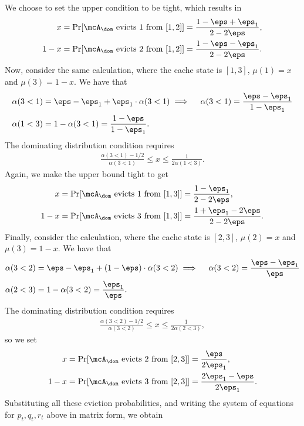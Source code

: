\documentclass[11pt]{article}
\begin{document}
We choose to set the upper condition to be tight, which results in
\begin{align*}
    x &= \Pr[\text{$\mcA_\dom$ evicts 1 from }[1,2]] = \frac{1-\eps+\eps_1}{2-2\eps}, \\
    1-x &= \Pr[\text{$\mcA_\dom$ evicts 2 from }[1,2]] = \frac{1-\eps-\eps_1}{2-2\eps}.
\end{align*}
Now, consider the same calculation, where the cache state is $[1,3]$, $\mu(1)=x$ and $\mu(3)=1-x$. We have that
\begin{align*}
    \alpha(3<1) &= \eps-\eps_1 + \eps_1 \cdot \alpha(3<1) \implies\quad \alpha(3<1) = \frac{\eps-\eps_1}{1-\eps_1} \\
    \alpha(1<3) &= 1-\alpha(3<1) = \frac{1-\eps}{1-\eps_1}.
\end{align*}
The dominating distribution condition requires
\begin{align*} 
    \frac{\alpha(3<1)-1/2}{\alpha(3<1)} \le x \le \frac{1}{2\alpha(1<3)}.
\end{align*}
Again, we make the upper bound tight to get
\begin{align*}
    x &= \Pr[\text{$\mcA_\dom$ evicts 1 from }[1,3]] = \frac{1-\eps_1}{2-2\eps}, \\
    1-x &= \Pr[\text{$\mcA_\dom$ evicts 3 from }[1,3]] = \frac{1+\eps_1-2\eps}{2-2\eps}.
\end{align*}
Finally, consider the calculation, where the cache state is $[2,3]$, $\mu(2)=x$ and $\mu(3)=1-x$. We have that
\begin{align*}
    \alpha(3<2) &= \eps-\eps_1 + (1-\eps) \cdot \alpha(3<2) \implies\quad \alpha(3<2) = \frac{\eps-\eps_1}{\eps} \\
    \alpha(2<3) &= 1-\alpha(3<2) = \frac{\eps_1}{\eps}.
\end{align*}
The dominating distribution condition requires
\begin{align*} 
    \frac{\alpha(3<2)-1/2}{\alpha(3<2)} \le x \le \frac{1}{2\alpha(2<3)},
\end{align*}
so we set
\begin{align*}
    x &= \Pr[\text{$\mcA_\dom$ evicts 2 from }[2,3]] = \frac{\eps}{2\eps_1}, \\
    1-x &= \Pr[\text{$\mcA_\dom$ evicts 3 from }[2,3]] = \frac{2\eps_1-\eps}{2\eps_1}.
\end{align*}
Substituting all these eviction probabilities, and writing the system of equations for $p_t,q_t,r_t$ above in matrix form, we obtain
\end{document}

